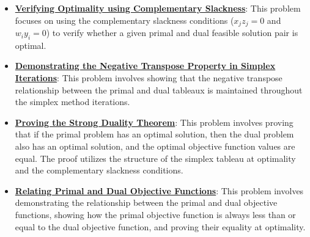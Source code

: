 \documentclass{article}%
\begin{document}
\begin{itemize}[leftmargin=*]%
\item \href{https://www.math.purdue.edu/~yipn/421/2024-09-12-Duality.pdf#page=21}{\textbf{Verifying Optimality using Complementary Slackness}}: This problem focuses on using the complementary slackness conditions ($x_j z_j = 0$ and $w_i y_i = 0$) to verify whether a given primal and dual feasible solution pair is optimal.%
\item \href{https://www.math.purdue.edu/~yipn/421/2024-09-12-Duality.pdf#page=6}{\textbf{Demonstrating the Negative Transpose Property in Simplex Iterations}}: This problem involves showing that the negative transpose relationship between the primal and dual tableaux is maintained throughout the simplex method iterations.%
\item \href{https://www.math.purdue.edu/~yipn/421/2024-09-12-Duality.pdf#page=11}{\textbf{Proving the Strong Duality Theorem}}: This problem involves proving that if the primal problem has an optimal solution, then the dual problem also has an optimal solution, and the optimal objective function values are equal. The proof utilizes the structure of the simplex tableau at optimality and the complementary slackness conditions.%
\item \href{https://www.math.purdue.edu/~yipn/421/2024-09-12-Duality.pdf#page=22}{\textbf{Relating Primal and Dual Objective Functions}}: This problem involves demonstrating the relationship between the primal and dual objective functions, showing how the primal objective function is always less than or equal to the dual objective function, and proving their equality at optimality.%
\end{itemize}%
\end{document}
